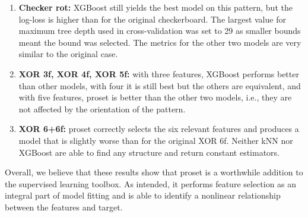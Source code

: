 \begin{enumerate}
\item\textbf{Checker rot:} XGBoost still yields the best model on this pattern, but the log-loss is higher than for the original checkerboard.
The largest value for maximum tree depth used in cross-validation was set to 29 as smaller bounds meant the bound was selected.
The metrics for the other two models are very similar to the original case.
%
\item\textbf{XOR 3f, XOR 4f, XOR 5f:} with three features, XGBoost performs better than other models, with four it is still best but the others are equivalent, and with five features, proset is better than the other two models, i.e., they are not affected by the orientation of the pattern.
%
\item\textbf{XOR 6+6f:} proset correctly selects the six relevant features and produces a model that is slightly worse than for the original XOR 6f.
Neither kNN nor XGBoost are able to find any structure and return constant estimators.
\end{enumerate}
%
Overall, we believe that these results show that proset is a worthwhile addition to the supervised learning toolbox.
As intended, it performs feature selection as an integral part of model fitting and is able to identify a nonlinear relationship between the features and target.
%
